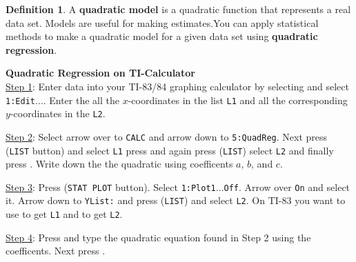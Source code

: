 \documentclass{report}
\theoremstyle{definition}
\newtheorem{definition}{\bf Definition}[section]
\begin{document}
\vspace{2.5cm}


\begin{definition}
A \textbf{quadratic model} is a quadratic function that represents a real data set. Models are useful for making estimates.You can apply statistical methods to make a quadratic model for a given data set using \textbf{quadratic regression}.\\
\end{definition}

\large\noindent\textbf{Quadratic Regression on TI-Calculator}\normalsize\\

\vspace{-0.5cm}
\noindent \underline{Step 1}: Enter data into your TI-83/84 graphing calculator by selecting  and select \texttt{1:Edit$\ldots$}. Enter the  all the $x$-coordinates in the list \texttt{L1} and all the corresponding $y$-coordinates in the \texttt{L2}.

\vspace{-0.35cm}
\noindent \underline{Step 2}: Select  arrow over to \texttt{CALC} and arrow down to \texttt{5:QuadReg}. Next press   (\texttt{LIST} button) and select \texttt{L1} press \tcbox[size=small, on line]{,} and again press   (\texttt{LIST}) select \texttt{L2} and finally press . Write down the the quadratic using coefficents $a$, $b$, and $c$.

\vspace{-0.35cm}
\noindent \underline{Step 3}: Press   (\texttt{STAT PLOT} button). Select \texttt{1:Plot1$\ldots$Off}. Arrow over \texttt{On} and select it. Arrow down to \texttt{YList:} and press   (\texttt{LIST}) and select \texttt{L2}. On TI-83 you want to use   to get \texttt{L1} and   to get \texttt{L2}.

\vspace{-0.35cm}
\noindent \underline{Step 4}: Press  and type the quadratic equation found in Step 2 using the coefficents. Next press .
\end{document}
